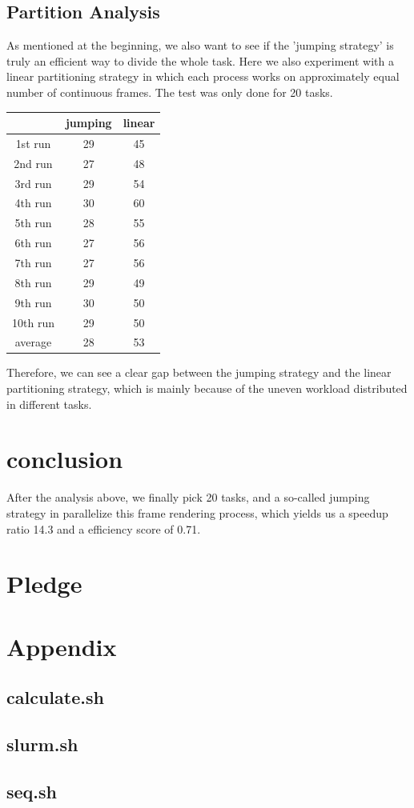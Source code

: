 \documentclass{cs4444}
\begin{document}
\subsection{Partition Analysis}
 As mentioned at the beginning, we also want to see if the 'jumping strategy' is truly an efficient way to divide the whole task. Here we also experiment with a linear partitioning strategy in which each process works on approximately equal number of continuous frames. The test was only done for 20 tasks.
   \begin{center}
\begin{tabular}{ |c|c|c| }
\hline
 & jumping & linear \\
\hline
 1st run & 29 & 45 \\ 
 2nd run & 27 & 48 \\ 
 3rd run & 29 & 54 \\
 4th run & 30 & 60 \\
 5th run & 28 & 55 \\
 6th run & 27 & 56 \\
 7th run & 27 & 56 \\
 8th run & 29 & 49 \\
 9th run & 30 & 50 \\
 10th run & 29 & 50 \\
 \hline
 average & 28 & 53\\
 \hline
\end{tabular}
\end{center}
Therefore, we can see a clear gap between the jumping strategy and the linear partitioning strategy, which is mainly because of the uneven workload distributed in different tasks. 

\section{conclusion}
After the analysis above, we finally pick 20 tasks, and a so-called jumping strategy in parallelize this frame rendering process, which yields us a speedup ratio 14.3 and a efficiency score of 0.71. 
\section{Pledge}

\pledge
\newpage
\section{Appendix}
\subsection{calculate.sh}

\newpage
\subsection{slurm.sh}

\subsection{seq.sh}

\end{document}
